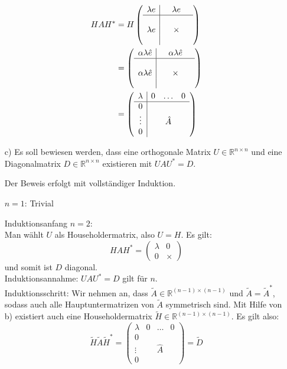 \documentclass[11pt]{article}
\theoremstyle{plain}
\theoremstyle{definition}
\renewcommand{\a}{\"{a}}
\renewcommand{\u}{\"{u}}
\begin{document}
\begin{itemize}
\begin{align}
HAH^* 
&=
H
\left(
\begin{array}{c|ccc}
\lambda e &  & \lambda e &     \\\hline
  & & &                    \\
\lambda e & & \times &        \\
  & & &
\end{array}
\right)\\
&=
\left(
\begin{array}{c|ccc}
\alpha\lambda\hat{e} &  & \alpha\lambda\hat{e} &     \\\hline
  & & &                    \\
\alpha\lambda\hat{e} & & \times &        \\
  & & &
\end{array}
\right)\\
&=
\left(
\begin{array}{c|ccc}
\lambda &  0 & \hdots &   0  \\\hline
0  & & &                    \\
\vdots & & \hat{A} &        \\
0  & & &
\end{array}
\right)\\
\end{align}


\item[c)]
Es soll bewiesen werden, dass eine orthogonale Matrix $U \in \mathbb{R}^{n \times n}$ und eine Diagonalmatrix $D \in \mathbb{R}^{n \times n}$  existieren mit $UAU^*=D$. 

Der Beweis erfolgt mit vollst\a ndiger Induktion.

$n=1$: Trivial

Induktionsanfang $n = 2$:\\
Man w\a hlt $U$ als Householdermatrix, also $U=H$. Es gilt:
\begin{equation}
HAH^* =
\begin{pmatrix}
\lambda & 0 \\
0       & \times
\end{pmatrix}
\end{equation}
und somit ist $D$ diagonal.\\

Induktionsannahme: $UAU^*=D$ gilt f\u r $n$.\\

Induktionsschritt: Wir nehmen an, dass $\tilde{A}\in \mathbb{R}^{(n-1)\times(n-1)}$ und $\tilde{A}=\tilde{A}^*$, sodass auch alle Hauptuntermatrizen von $\tilde{A}$ symmetrisch sind. Mit Hilfe von b) existiert auch eine Householdermatrix $\tilde{H} \in \mathbb{R}^{(n-1)\times(n-1)}$.
Es gilt also:
\begin{equation}
\tilde{H}\tilde{A}\tilde{H}^* = 
\left(
\begin{array}{c|ccc}
\lambda & 0 & \hdots & 0    \\\hline
0  & & &                    \\
\vdots & & \hat{A} &        \\
0  & & &
\end{array}
\right)
= \tilde{D}
\end{equation}


\end{itemize}
\end{document}
